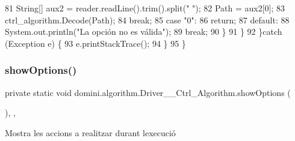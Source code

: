 \begin{DoxyCode}
81                     String[] aux2 = reader.readLine().trim().split(\textcolor{stringliteral}{" "});
82                     Path = aux2[0];
83                     ctrl\_algorithm.Decode(Path);
84                 \textcolor{keywordflow}{break};
85                 \textcolor{keywordflow}{case} \textcolor{stringliteral}{"0"}:
86                     \textcolor{keywordflow}{return};
87                 \textcolor{keywordflow}{default}:
88                     System.out.println(\textcolor{stringliteral}{"La opción no es válida"});
89                 \textcolor{keywordflow}{break};
90             \}
91         \}
92     \}\textcolor{keywordflow}{catch} (Exception e) \{
93         e.printStackTrace();
94     \}
95     \}
\end{DoxyCode}
\mbox{\label{classdomini_1_1algorithm_1_1Driver____Ctrl__Algorithm_afad303731ad32c08c8dbffbf63b3fd9f}} 
\subsubsection{\texorpdfstring{show\+Options()}{showOptions()}}
{\footnotesize\ttfamily private static void domini.\+algorithm.\+Driver\+\_\+\+\_\+\+Ctrl\+\_\+\+Algorithm.\+show\+Options (\begin{DoxyParamCaption}{ }\end{DoxyParamCaption})\hspace{0.3cm}{\ttfamily [inline]}, {\ttfamily [static]}, {\ttfamily [private]}}



Mostra les accions a realitzar durant l\textquotesingle{}execució 


